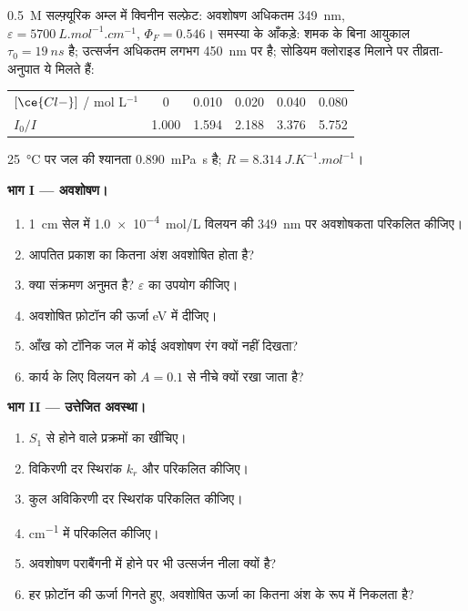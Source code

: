 \begin{problem}
\label{pb:b3:electronic-spectroscopy:1}
\qty{0.5}{M} सल्फ़्यूरिक अम्ल में क्विनीन सल्फ़ेट: अवशोषण अधिकतम \qty{349}{nm},
$\varepsilon = \qty{5700}{L.mol^{-1}.cm^{-1}}$, $\Phi_F = 0.546$। समस्या के आँकड़े:
शमक के बिना  आयुकाल $\tau_0 = \qty{19}{ns}$ है; उत्सर्जन
अधिकतम लगभग \qty{450}{nm} पर है; सोडियम क्लोराइड मिलाने पर तीव्रता-अनुपात ये मिलते हैं:
\begin{center}\small
\begin{tabular}{lccccc}
\hline
$[\ce{Cl-}]$ / mol L$^{-1}$ & 0 & 0.010 & 0.020 & 0.040 & 0.080 \\
$I_0/I$ & 1.000 & 1.594 & 2.188 & 3.376 & 5.752 \\ \hline
\end{tabular}
\end{center}
\qty{25}{\celsius} पर जल की श्यानता \qty{0.890}{mPa.s} है; $R =
\qty{8.314}{J.K^{-1}.mol^{-1}}$।

\medskip\noindent\textbf{भाग I --- अवशोषण।}
\begin{enumerate}
  \item \qty{1}{cm} सेल में \qty{1.0e-4}{mol/L} विलयन की \qty{349}{nm} पर
        अवशोषकता परिकलित कीजिए।
  \item आपतित प्रकाश का कितना अंश अवशोषित होता है?
  \item क्या संक्रमण अनुमत है? $\varepsilon$ का उपयोग कीजिए।
  \item अवशोषित फ़ोटॉन की ऊर्जा eV में दीजिए।
  \item आँख को टॉनिक जल में कोई अवशोषण रंग क्यों नहीं दिखता?
  \item {} कार्य के लिए विलयन को $A = 0.1$ से नीचे क्यों रखा जाता है?
\end{enumerate}

\medskip\noindent\textbf{भाग II --- उत्तेजित अवस्था।}
\begin{enumerate}[resume]
  \item $S_1$ से होने वाले प्रक्रमों का  खींचिए।
  \item विकिरणी दर स्थिरांक $k_r$ और  परिकलित कीजिए।
  \item कुल अविकिरणी दर स्थिरांक परिकलित कीजिए।
  \item {} \unit{cm^{-1}} में परिकलित कीजिए।
  \item अवशोषण पराबैंगनी में होने पर भी उत्सर्जन नीला क्यों है?
  \item हर फ़ोटॉन की ऊर्जा गिनते हुए, अवशोषित ऊर्जा का कितना अंश  के रूप में
        निकलता है?
\end{enumerate}


\end{problem}
